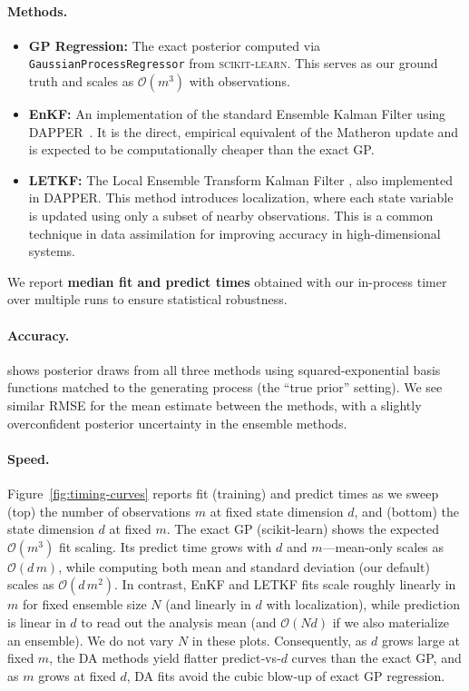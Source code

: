 \documentclass[wcp]{jmlr} %
\begin{document}
\paragraph{Methods.}
\begin{itemize}
    \item \textbf{GP Regression:} The exact posterior computed via \texttt{GaussianProcessRegressor} from \textsc{scikit-learn}. This serves as our ground truth and scales as $\mathcal{O}(m^3)$ with observations.
    \item \textbf{EnKF:} An implementation of the standard Ensemble Kalman Filter using DAPPER~\citep{Raanes2024DAPPER}. It is the direct, empirical equivalent of the Matheron update and is expected to be computationally cheaper than the exact GP.
    \item \textbf{LETKF:} The Local Ensemble Transform Kalman Filter \citep{Hunt2007Efficient,Bocquet2020Online}, also implemented in DAPPER. This method introduces localization, where each state variable is updated using only a subset of nearby observations. This is a common technique in data assimilation for improving accuracy in high-dimensional systems.
\end{itemize}

We report \textbf{median fit and predict times} obtained with our in-process timer over multiple runs to ensure statistical robustness.

\paragraph{Accuracy.}
 shows posterior draws from all three methods using squared-exponential basis functions matched to the generating process (the ``true prior'' setting). We see similar RMSE for the mean estimate between the methods, with a slightly overconfident posterior uncertainty in the ensemble methods.

\paragraph{Speed.}

Figure~\ref{fig:timing-curves} reports fit (training) and predict times as we sweep (top) the number of observations $m$ at fixed state dimension $d$, and (bottom) the state dimension $d$ at fixed $m$.
The exact GP (scikit-learn) shows the expected $\mathcal O(m^3)$ fit scaling.
Its predict time grows with $d$ and $m$—mean-only scales as $\mathcal O(d\,m)$, while computing both mean and standard deviation (our default) scales as $\mathcal O(d\,m^2)$.
In contrast, EnKF and LETKF fits scale roughly linearly in $m$ for fixed ensemble size $N$ (and linearly in $d$ with localization), while prediction is linear in $d$ to read out the analysis mean (and $\mathcal O(Nd)$ if we also materialize an ensemble).
We do not vary $N$ in these plots.
Consequently, as $d$ grows large at fixed $m$, the DA methods yield flatter predict‑vs‑$d$ curves than the exact GP, and as $m$ grows at fixed $d$, DA fits avoid the cubic blow‑up of exact GP regression.
\end{document}
